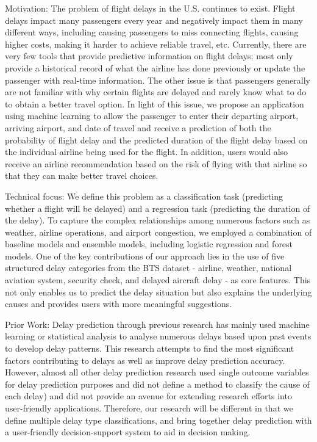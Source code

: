Motivation: 
The problem of flight delays in the U.S. continues to exist. Flight delays impact many passengers every year and negatively impact them in many different ways, including causing passengers to miss connecting flights, causing higher costs, making it harder to achieve reliable travel, etc. Currently, there are very few tools that provide predictive information on flight delays; most only provide a historical record of what the airline has done previously or update the passenger with real-time information. The other issue is that passengers generally are not familiar with why certain flights are delayed and rarely know what to do to obtain a better travel option. In light of this issue, we propose an application using machine learning to allow the passenger to enter their departing airport, arriving airport, and date of travel and receive a prediction of both the probability of flight delay and the predicted duration of the flight delay based on the individual airline being used for the flight. In addition, users would also receive an airline recommendation based on the risk of flying with that airline so that they can make better travel choices.

Technical focus: We define this problem as a classification task (predicting whether a flight will be delayed) and a regression task (predicting the duration of the delay). To capture the complex relationships among numerous factors such as weather, airline operations, and airport congestion, we employed a combination of baseline models and ensemble models, including logistic regression and forest models. One of the key contributions of our approach lies in the use of five structured delay categories from the BTS dataset - airline, weather, national aviation system, security check, and delayed aircraft delay - as core features. This not only enables us to predict the delay situation but also explains the underlying causes and provides users with more meaningful suggestions.

Prior Work: Delay prediction through previous research has mainly used machine learning or statistical analysis to analyse numerous delays based upon past events to develop delay patterns. This research attempts to find the most significant factors contributing to delays as well as improve delay prediction accuracy. However, almost all other delay prediction research used single outcome variables for delay prediction purposes and did not define a method to classify the cause of each delay) and did not provide an avenue for extending research efforts into user-friendly applications. Therefore, our research will be different in that we define multiple delay type classifications, and bring together delay prediction with a user-friendly decision-support system to aid in decision making.

